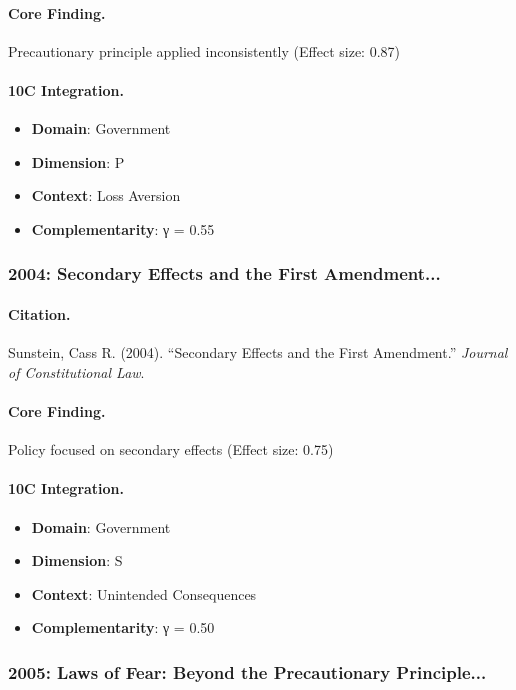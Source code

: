 \paragraph{Core Finding.}
Precautionary principle applied inconsistently (Effect size: 0.87)

\paragraph{10C Integration.}
\begin{itemize}[nosep]
  \item \textbf{Domain}: Government
  \item \textbf{Dimension}: P
  \item \textbf{Context}: Loss Aversion
  \item \textbf{Complementarity}: γ = 0.55
\end{itemize}

\subsubsection{2004: Secondary Effects and the First Amendment...}

\paragraph{Citation.}
Sunstein, Cass R. (2004). ``Secondary Effects and the First Amendment.''
\textit{Journal of Constitutional Law}.

\paragraph{Core Finding.}
Policy focused on secondary effects (Effect size: 0.75)

\paragraph{10C Integration.}
\begin{itemize}[nosep]
  \item \textbf{Domain}: Government
  \item \textbf{Dimension}: S
  \item \textbf{Context}: Unintended Consequences
  \item \textbf{Complementarity}: γ = 0.50
\end{itemize}

\subsubsection{2005: Laws of Fear: Beyond the Precautionary Principle...}

